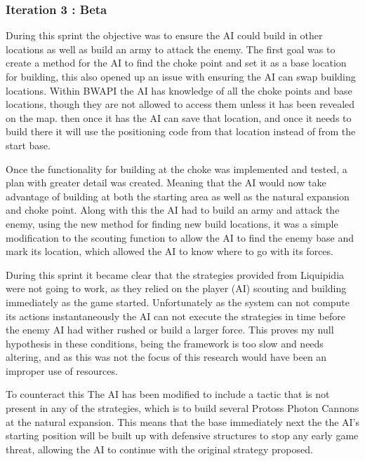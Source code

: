 \documentclass[journal]{IEEEtran}
\begin{document}
\subsubsection{Iteration 3 : Beta}
During this sprint the objective was to ensure the AI could build in other locations as well as build an army to attack the enemy. The first goal was to create a method for the AI to find the choke point and set it as a base location for building, this also opened up an issue with ensuring the AI can swap building locations. Within BWAPI the AI has knowledge of all the choke points and base locations, though they are not allowed to access them unless it has been revealed on the map. then once it has the AI can save that location, and once it needs to build there it will use the positioning code from that location instead of from the start base. 

Once the functionality for building at the choke was implemented and tested, a plan with greater detail was created. Meaning that the AI would now take advantage of building at both the starting area as well as the natural expansion and choke point. Along with this the AI had to build an army and attack the enemy, using the new method for finding new build locations, it was a simple modification to the scouting function to allow the AI to find the enemy base and mark its location, which allowed the AI to know where to go with its forces.

During this sprint it became clear that the strategies provided from Liquipidia were not going to work, as they relied on the player (AI) scouting and building immediately as the game started. Unfortunately as the system can not compute its actions instantaneously the AI can not execute the strategies in time before the enemy AI had wither rushed or build a larger force. This proves my null hypothesis in these conditions, being the framework is too slow and needs altering, and as this was not the focus of this research would have been an improper use of resources.

To counteract this The AI has been modified to include a tactic that is not present in any of the strategies, which is to build several Protoss Photon Cannons at the natural expansion. This means that the base immediately next the the AI's starting position will be built up with defensive structures to stop any early game threat, allowing the AI to continue with the original strategy proposed.
\newline
\end{document}
